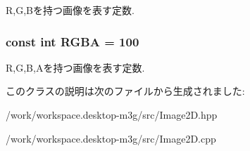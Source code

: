 R,G,Bを持つ画像を表す定数. \hypertarget{classm3g_1_1Image2D_0aaf9f2f4c064633c6d2888ec2c39e92}{
\subsubsection[{RGBA}]{\setlength{\rightskip}{0pt plus 5cm}const int {\bf RGBA} = 100}}
\label{classm3g_1_1Image2D_0aaf9f2f4c064633c6d2888ec2c39e92}


R,G,B,Aを持つ画像を表す定数. 

このクラスの説明は次のファイルから生成されました:\begin{CompactItemize}
\item 
/work/workspace.desktop-m3g/src/Image2D.hpp\item 
/work/workspace.desktop-m3g/src/Image2D.cpp\end{CompactItemize}
